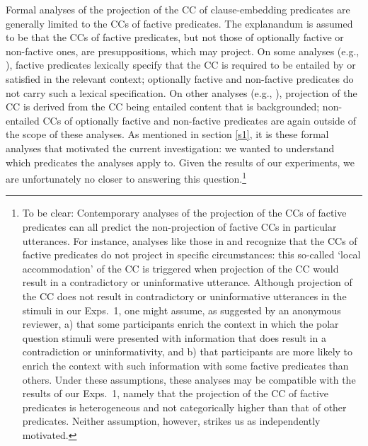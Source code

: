 \documentclass[11pt,fleqn]{article}
\newcommand{\6}{\mbox{$[\hspace*{-.6mm}[$}}
\newcommand{\9}{\mbox{$]\hspace*{-.6mm}]$}}
\begin{document}
Formal analyses of the projection of the CC of clause-embedding predicates are generally limited to the CCs of factive predicates. The explanandum is assumed to be that the CCs of factive predicates, but not those of optionally factive or non-factive ones, are presuppositions, which may project. On some analyses (e.g., \citealt{heim83,vds92}), factive predicates lexically specify that the CC is required to be entailed by or satisfied in the relevant context; optionally factive and non-factive predicates do not carry such a lexical specification. On other analyses (e.g., \citealt{abrusan2011,abrusan2016,romoli2015,best-question}), projection of the CC is derived from the CC being entailed content that is backgrounded; non-entailed CCs of optionally factive and non-factive predicates are again outside of the scope of these analyses. As mentioned in section \ref{s1}, it is these formal analyses that motivated the current investigation: we wanted to understand which predicates the analyses apply to.  Given the results of our experiments, we are unfortunately no closer to answering this question.\footnote{To be clear: Contemporary analyses of the projection of the CCs of factive predicates can all predict the non-projection of factive CCs in particular utterances. For instance, analyses like those in \citealt{heim83} and \citealt{vds92} recognize that the CCs of factive predicates do not project in specific circumstances: this so-called `local accommodation' of the CC is triggered when projection of the CC would result in a contradictory or uninformative utterance. Although projection of the CC does not result in contradictory or uninformative utterances in the stimuli in our Exps.~1, one might assume, as suggested by an anonymous reviewer, a) that some participants enrich the context in which the polar question stimuli were presented with information that does result in a contradiction or uninformativity, and b) that participants are more likely to enrich the context with such information with some factive predicates than others. Under these assumptions, these analyses may be compatible with the results of our Exps.~1, namely that the projection of the CC of factive predicates is heterogeneous and not categorically higher than that of other predicates. Neither assumption, however, strikes us as independently motivated.} 
\end{document}
